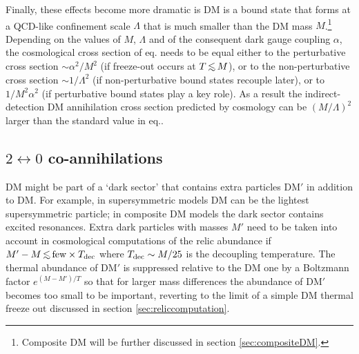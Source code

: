 \medskip

Finally, these effects become more dramatic is DM is a bound state that forms at a QCD-like confinement scale $\Lambda$ that is much smaller than the DM mass $M$.\footnote{Composite DM will be further discussed in section \ref{sec:compositeDM}.}
Depending on the values of $M$, $\Lambda$ and of the consequent dark gauge coupling $\alpha$,
the cosmological cross section of eq. needs to be equal either to
the perturbative cross section $\sim \alpha^2/M^2$ (if freeze-out occurs at $T \circa{<} M$),
or to the non-perturbative cross section $\sim 1/\Lambda^2$ (if non-perturbative bound states recouple later),
or to $1/M^2 \alpha^2$ (if perturbative bound states play a key role).
As a result the indirect-detection DM annihilation cross section predicted by cosmology can be 
$(M/\Lambda)^2$ larger than the standard value in eq..


\subsection{$2\leftrightarrow 0$ co-annihilations}\label{sec:coann}
DM might be part of a `dark sector' that contains extra particles DM$'$ in addition to DM.
For example, in supersymmetric models DM can be the lightest supersymmetric particle;
in composite DM models the dark sector contains excited resonances.
Extra dark particles with masses $M'$ need to be taken into account in cosmological computations
of the relic abundance if $M' - M \circa{<}\hbox{few}\times T_{\rm dec}$ where $T_{\rm dec} \sim M/25$ is the 
decoupling temperature. The thermal abundance  of DM$'$ is suppressed relative to the DM one
by a Boltzmann factor $e^{(M-M')/T}$ so that for larger mass differences the abundance of DM$'$ becomes too small to be important, 
reverting  to the limit of a simple DM thermal freeze out discussed in section \ref{sec:reliccomputation}.

